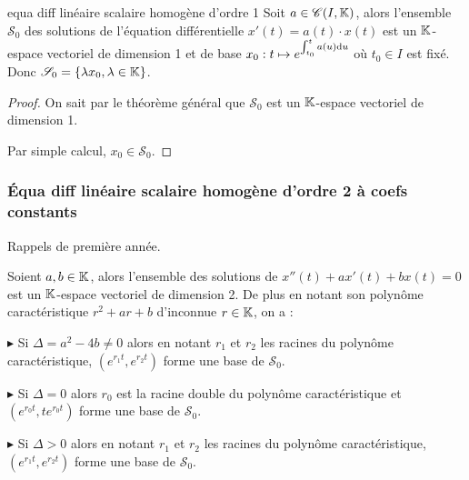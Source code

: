 
\begin{theoreme}{equa diff linéaire scalaire homogène d'ordre 1}{}
    Soit $a \in \mathscr C (I, \mathbb{K})$, alors l'ensemble $\mathscr S_0$ des solutions de l'équation différentielle  
    ${x'(t) = a(t) \cdot x(t)}$ est un $\mathbb{K}$-espace vectoriel de dimension 1 et de 
    base $x_0 \displaystyle : t \mapsto e^{\int_{t_0}^{t} a(u) \mathrm d u}$ où 
    $t_0 \in I$ est fixé. Donc $\mathscr S_0 = \{ \lambda x_0, \lambda \in \mathbb{K} \}$.
\end{theoreme}

\begin{proof}
    On sait par le théorème général que $\mathscr S_0$ est un $\mathbb{K}$-espace vectoriel de dimension 1. 

    Par simple calcul, $x_0 \in \mathscr S_0$.
\end{proof}

\subsubsection{\'Equa diff linéaire scalaire homogène d'ordre 2 à coefs constants}

Rappels de première année. 

Soient $a, b \in \mathbb{K}$, alors l'ensemble des solutions de $x''(t) + ax'(t) +bx(t) = 0$ est 
un $\mathbb{K}$-espace vectoriel de dimension 2. De plus en notant son polynôme 
caractéristique $r^2 + ar + b$ d'inconnue $r \in \mathbb{K}$, on a : 


\svspace $\blacktriangleright$ Si $\Delta = a^2 - 4b \neq 0$ alors en notant $r_1$ et $r_2$ les racines 
du polynôme caractéristique, $(e^{r_1 t}, e^{r_2 t})$ forme une base de $\mathscr S_0$.

$\blacktriangleright$ Si $\Delta = 0$ alors $r_0$ est la racine double du polynôme caractéristique et $(e^{r_0 t}, te^{r_0 t})$ forme une base de $\mathscr S_0$.


\svspace $\blacktriangleright$ Si $\Delta > 0$ alors en notant $r_1$ et $r_2$ les racines du polynôme caractéristique, $(e^{r_1 t}, e^{r_2 t})$ forme une base de $\mathscr S_0$.

